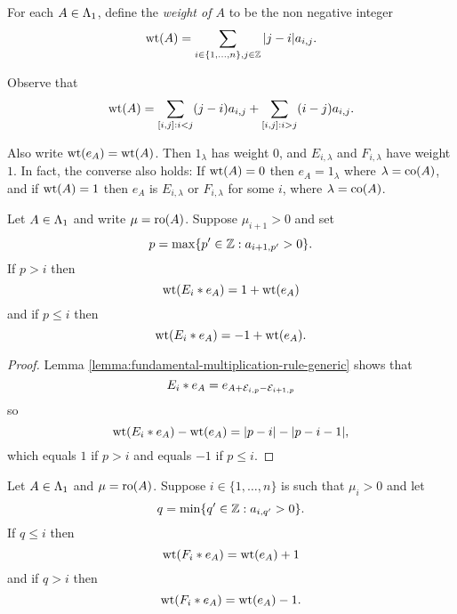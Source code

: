 \documentclass[a4paper, 11pt]{report}
\begin{document}
\begin{definition}\label{def:weight-of-matrix}
For each $A\in\Lambda_1{}$, define the \emph{weight of $A$} to be the non negative integer
\begin{equation*}
\operatorname{wt}(A) = \sum_{i\in\{1,\ldots,n\},j\in\mathbb{Z}} |j-i| a_{i,j}.
\end{equation*}
\end{definition}

Observe that
\begin{equation*}
\operatorname{wt}(A) = \sum_{[i,j]:i<j}(j-i)a_{i,j} + \sum_{[i,j]:i>j}(i-j)a_{i,j}.
\end{equation*}

Also write $\operatorname{wt}(e_A) = \operatorname{wt}(A)$. Then $1_\lambda$ has weight $0$, and $E_{i,\lambda}$ and $F_{i,\lambda}$ have weight $1$. In fact, the converse also holds: If $\operatorname{wt}(A)=0$ then $e_A=1_\lambda$ where $\lambda=\operatorname{co}(A)$, and if $\operatorname{wt}(A)=1$ then $e_A$ is $E_{i,\lambda}$ or $F_{i,\lambda}$ for some $i$, where $\lambda=\operatorname{co}(A)$.

\begin{lemma}\label{lemma:weight-change-E}
Let $A\in\Lambda_1{}$ and write $\mu=\operatorname{ro}(A)$. Suppose $\mu_{i+1}>0$ and set
\begin{equation*}
p=\max\{p'\in\mathbb{Z}: a_{i+1,p'}>0\}.
\end{equation*}
If $p>i$ then
\begin{equation*}
\operatorname{wt}(E_i\ast e_A)=1+\operatorname{wt}(e_A)
\end{equation*}
and if $p\le i$ then
\begin{equation*}
\operatorname{wt}(E_i\ast e_A)=-1+\operatorname{wt}(e_A).
\end{equation*}
\end{lemma}

\begin{proof}
Lemma \ref{lemma:fundamental-multiplication-rule-generic} shows that
\begin{equation*}
E_i\ast e_A = e_{A+\mathcal{E}_{i,p}-\mathcal{E}_{i+1,p}}
\end{equation*}
so
\begin{equation*}
\operatorname{wt}(E_i\ast e_A) - \operatorname{wt}(e_A) = |p-i| - |p-i-1|,
\end{equation*}
which equals $1$ if $p>i$ and equals $-1$ if $p\le i$.
\end{proof}

\begin{lemma}\label{lemma:weight-change-F}
Let $A\in\Lambda_1{}$ and $\mu=\operatorname{ro}(A)$. Suppose $i\in\{1,\ldots,n\}$ is such that $\mu_i>0$ and let
\begin{equation*}
q = \min\{q'\in\mathbb{Z}:a_{i,q'}>0\}.
\end{equation*}
If $q\le i$ then
\begin{equation*}
\operatorname{wt}(F_i\ast e_A) = \operatorname{wt}(e_A) + 1
\end{equation*}
and if $q>i$ then
\begin{equation*}
\operatorname{wt}(F_i\ast e_A) = \operatorname{wt}(e_A) - 1.
\end{equation*}
\end{lemma}
\end{document}
